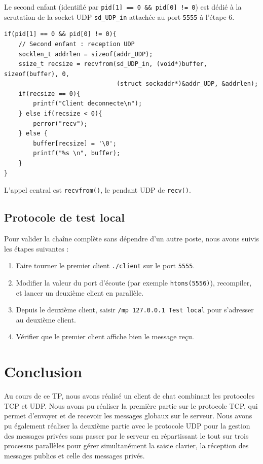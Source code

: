 \documentclass[a4paper,12pt,french]{article}
\begin{document}
Le second enfant (identifié par \texttt{pid[1] == 0 \&\& pid[0] != 0}) est dédié à la
scrutation de la socket UDP \texttt{sd\_UDP\_in} attachée au port \texttt{5555} à l'étape 6.

\begin{verbatim}
if(pid[1] == 0 && pid[0] != 0){
    // Second enfant : reception UDP
    socklen_t addrlen = sizeof(addr_UDP);
    ssize_t recsize = recvfrom(sd_UDP_in, (void*)buffer, sizeof(buffer), 0,
                               (struct sockaddr*)&addr_UDP, &addrlen);
    if(recsize == 0){
        printf("Client deconnecte\n");
    } else if(recsize < 0){
        perror("recv");
    } else {
        buffer[recsize] = '\0';
        printf("%s \n", buffer);
    }
}
\end{verbatim}

L'appel central est \texttt{recvfrom()}, le pendant UDP de \texttt{recv()}.

\subsection*{Protocole de test local}

Pour valider la chaîne complète sans dépendre d'un autre poste, nous avons suivis les étapes suivantes :
\begin{enumerate}
    \item Faire tourner le premier client \texttt{./client} sur le port \texttt{5555}.
    \item Modifier la valeur du port d'écoute (par exemple \texttt{htons(5556)}), recompiler, et lancer un deuxième client en parallèle.
    \item Depuis le deuxième client, saisir \texttt{/mp 127.0.0.1 Test local} pour s'adresser au deuxième client.
    \item Vérifier que le premier client affiche bien le message reçu.
\end{enumerate}


\pagebreak
\section{Conclusion}

Au cours de ce TP, nous avons réalisé un client de chat combinant les protocoles TCP et UDP. Nous avons pu réaliser la première partie sur le protocole TCP, qui permet d'envoyer et de recevoir les messages globaux sur le serveur. Nous avons pu également réaliser la deuxième partie avec le protocole UDP pour la gestion des messages privées sans passer par le serveur en répartissant le tout sur trois processus parallèles pour gérer simultanément la saisie clavier, la réception des messages publics et celle des messages privés.

%
%

\end{document}
